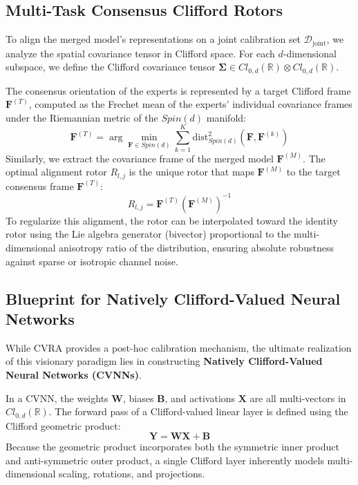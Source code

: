 \documentclass{article}
\begin{document}
\subsection{Multi-Task Consensus Clifford Rotors}
To align the merged model's representations on a joint calibration set $\mathcal{D}_{\text{joint}}$, we analyze the spatial covariance tensor in Clifford space. For each $d$-dimensional subspace, we define the Clifford covariance tensor $\mathbf{\Sigma} \in Cl_{0, d}(\mathbb{R}) \otimes Cl_{0, d}(\mathbb{R})$. 

The consensus orientation of the experts is represented by a target Clifford frame $\mathbf{F}^{(T)}$, computed as the Frechet mean of the experts' individual covariance frames under the Riemannian metric of the $Spin(d)$ manifold:
\begin{equation}
    \mathbf{F}^{(T)} = \arg\min_{\mathbf{F} \in Spin(d)} \sum_{k=1}^K \text{dist}^2_{Spin(d)}\left(\mathbf{F}, \mathbf{F}^{(k)}\right)
\end{equation}
Similarly, we extract the covariance frame of the merged model $\mathbf{F}^{(M)}$. The optimal alignment rotor $R_{l, j}$ is the unique rotor that maps $\mathbf{F}^{(M)}$ to the target consensus frame $\mathbf{F}^{(T)}$:
\begin{equation}
    R_{l, j} = \mathbf{F}^{(T)} \left(\mathbf{F}^{(M)}\right)^{-1}
\end{equation}
To regularize this alignment, the rotor can be interpolated toward the identity rotor using the Lie algebra generator (bivector) proportional to the multi-dimensional anisotropy ratio of the distribution, ensuring absolute robustness against sparse or isotropic channel noise.

\subsection{Blueprint for Natively Clifford-Valued Neural Networks}
While CVRA provides a post-hoc calibration mechanism, the ultimate realization of this visionary paradigm lies in constructing \textbf{Natively Clifford-Valued Neural Networks (CVNNs)}.

In a CVNN, the weights $\mathbf{W}$, biases $\mathbf{B}$, and activations $\mathbf{X}$ are all multi-vectors in $Cl_{0, d}(\mathbb{R})$. The forward pass of a Clifford-valued linear layer is defined using the Clifford geometric product:
\begin{equation}
    \mathbf{Y} = \mathbf{W} \mathbf{X} + \mathbf{B}
\end{equation}
Because the geometric product incorporates both the symmetric inner product and anti-symmetric outer product, a single Clifford layer inherently models multi-dimensional scaling, rotations, and projections. 
\end{document}
